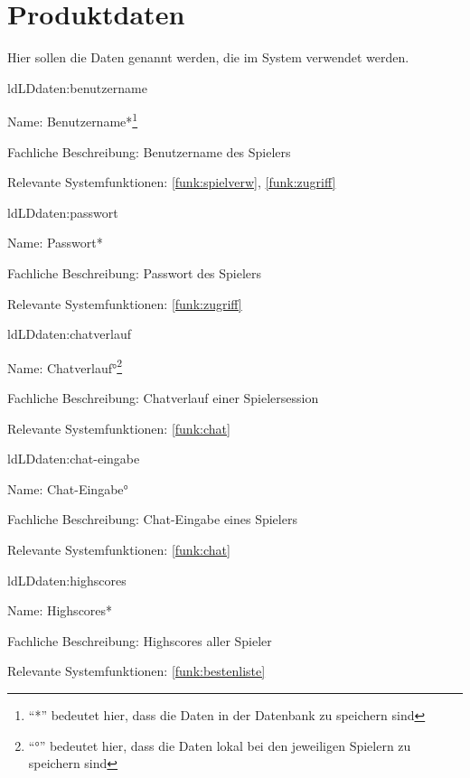 
\section{Produktdaten}\label{section:productdaten}

Hier sollen die Daten genannt werden, die im System verwendet werden.

\setcounter{ld}{10}

\begin{description}[leftmargin=5em, style=sameline]
	
	\begin{lhp}{ld}{LD}{daten:benutzername}
		\item [Name:] Benutzername*\footnote{``*'' bedeutet hier, dass die Daten in der Datenbank zu speichern sind}
		\item [Fachliche Beschreibung:] Benutzername des Spielers
		\item [Relevante Systemfunktionen:] \ref{funk:spielverw}, \ref{funk:zugriff}
	\end{lhp}
	
	\begin{lhp}{ld}{LD}{daten:passwort}
		\item [Name:] Passwort*
		\item [Fachliche Beschreibung:] Passwort des Spielers
		\item [Relevante Systemfunktionen:] \ref{funk:zugriff}
	\end{lhp}
	
	\begin{lhp}{ld}{LD}{daten:chatverlauf}
		\item [Name:] Chatverlauf°\footnote{``°'' bedeutet hier, dass die Daten lokal bei den jeweiligen Spielern zu speichern sind}
		\item [Fachliche Beschreibung:] Chatverlauf einer Spielersession
		\item [Relevante Systemfunktionen:] \ref{funk:chat}
	\end{lhp}
	
	\begin{lhp}{ld}{LD}{daten:chat-eingabe}
		\item [Name:] Chat-Eingabe°
		\item [Fachliche Beschreibung:] Chat-Eingabe eines Spielers
		\item [Relevante Systemfunktionen:] \ref{funk:chat}
	\end{lhp}
	
	\begin{lhp}{ld}{LD}{daten:highscores}
		\item [Name:] Highscores*
		\item [Fachliche Beschreibung:] Highscores aller Spieler
		\item [Relevante Systemfunktionen:] \ref{funk:bestenliste}
	\end{lhp}
	

\end{description}
